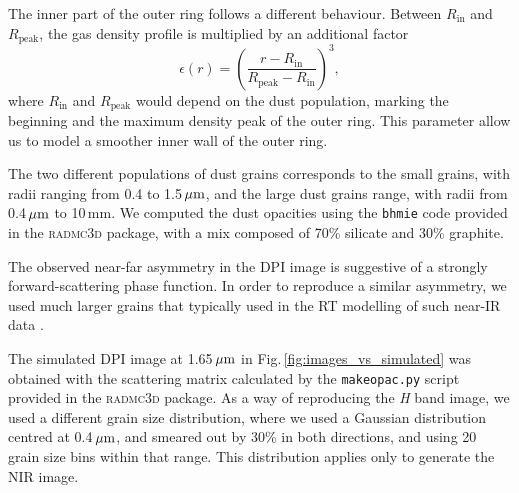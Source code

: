 \documentclass[letters,usenatbib,times]{mnras}
\begin{document}
The inner part of the outer ring follows a different behaviour. Between $R_\mathrm{in}$ and $R_\mathrm{peak}$, the gas density profile is multiplied by an additional factor
\begin{equation}
    \epsilon(r) = \left(\frac{ r - R_\mathrm{in}}{R_\mathrm{peak} - R_\mathrm{in}}\right)^3,
\end{equation}
where $R_\mathrm{in}$ and $R_\mathrm{peak}$ would depend on the dust population, marking the beginning and the maximum density peak of the outer ring. This parameter allow us to model a smoother inner wall of the outer ring.

The two different populations of dust grains corresponds to the small grains, with radii ranging from 0.4 to 1.5\,$\hbox{$\mu$m}$, and the large dust grains range, with radii from 0.4\,$\hbox{$\mu$m}$ to 10\,mm. We computed the dust opacities using the {\tt bhmie} code provided in the \textsc{radmc3d} package, with a mix composed of 70\% silicate and 30\% graphite. 

The observed near-far asymmetry in the DPI image is suggestive of a strongly forward-scattering phase function. In order to reproduce a similar asymmetry, we used much larger grains that typically used in the RT modelling of such near-IR data \citep[e.g.,][]{2018MNRAS.477.5104C}. 

The simulated DPI image at 1.65\,$\hbox{$\mu$m}$ in Fig.\,\ref{fig:images_vs_simulated} was obtained with the scattering matrix calculated by the {\tt makeopac.py} script provided in the \textsc{radmc3d} package. As a way of reproducing the \textit{H} band image, we used a different grain size distribution, where we used a Gaussian distribution centred at 0.4\,$\hbox{$\mu$m}$, and smeared out by 30\% in both directions, and using 20 grain size bins within that range. This distribution applies only to generate the NIR image.
\end{document}
